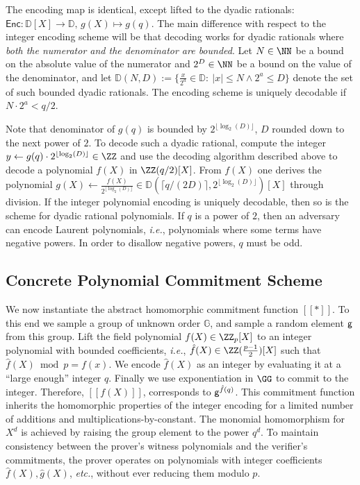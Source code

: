 The encoding map is identical, except lifted to the dyadic rationals: $\mathsf{Enc} : \mathbb{D}[X] \rightarrow \mathbb{D}, \, g(X) \mapsto g(q)$. The main difference with respect to the integer encoding scheme will be that decoding works for dyadic rationals where \emph{both the numerator and the denominator are bounded}. Let $N \in \NN$ be a bound on the absolute value of the numerator and $2^D\in \NN$ be a bound on the value of the denominator, and let $\mathbb{D}(N, D) :=\{\frac{x}{2^a} \in \mathbb{D} : \ |x|\leq N \wedge 2^a \leq D\}$ denote the set of such bounded dyadic rationals. The encoding scheme is uniquely decodable if $N \cdot 2^a < q/2$.
 
Note that denominator of $g(q)$ is bounded by $2^{\lfloor\log_2(D)\rfloor}$, $D$ rounded down to the next power of $2$. To decode such a dyadic rational, compute the integer $y \gets g(q) \cdot 2^{\lfloor\log_2(D)\rfloor}\in \ZZ$  and use the decoding algorithm described above to decode a polynomial $f(X)$ in $\ZZ(q/2)[X]$. From $f(X)$ one derives the polynomial  $g(X) \gets \frac{f(X)}{2^{\lfloor\log_2(D)\rfloor}} \in \mathbb{D}(\lceil q/(2D)\rceil, 2^{\lfloor\log_2(D)\rfloor})[X]$ through division. If the integer polynomial encoding is uniquely decodable, then so is the scheme for dyadic rational polynomials. If $q$ is a power of $2$, then an adversary can encode Laurent polynomials, \emph{i.e.}, polynomials where some terms have negative powers. In order to disallow negative powers, $q$ must be odd.

\subsection{Concrete Polynomial Commitment Scheme}
\label{subsec:concretepoly}
We now instantiate the abstract homomorphic commitment function $[\![ * ]\!]$. To this end we sample a group of unknown order $\mathbb{G}$, and sample a random element $\mathsf{g}$ from this group. 
Lift the field polynomial $f(X)\in \ZZ_p[X]$ to an integer polynomial with bounded coefficients, \emph{i.e.}, $\hat{f}(X)\in \ZZ(\frac{p-1}{2})[X]$ such that $\hat{f}(X)\bmod p=f(x)$.
We encode $\hat{f}(X)$ as an integer by evaluating it at a ``large enough'' integer $q$. Finally we use exponentiation in $\GG$ to commit to the integer. Therefore, $[\![f(X)]\!]$, corresponds to $\mathsf{g}^{\hat{f}(q)}$. This commitment function inherits the homomorphic properties of the integer encoding for a limited number of additions and multiplications-by-constant. The monomial homomorphism for $X^d$ is achieved by raising the group element to the power $q^{d}$. To maintain consistency between the prover's witness polynomials and the verifier's commitments, the prover operates on polynomials with integer coefficients  $\hat{f}(X), \hat{g}(X)$, \emph{etc.}, without ever reducing them modulo $p$.

